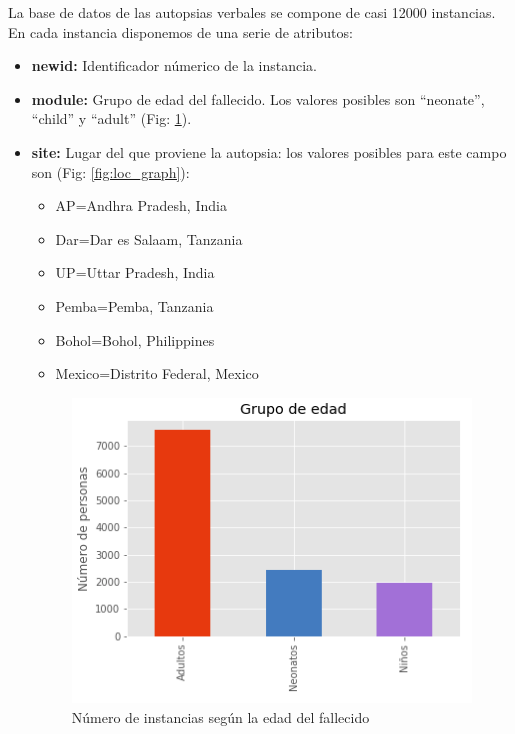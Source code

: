 \documentclass[10pt,a4paper]{article}
\begin{document}
La base de datos de las autopsias verbales se compone de casi 12000 instancias. En cada instancia disponemos de una serie de atributos:

\begin{itemize}
\item \textbf{newid:} Identificador númerico de la instancia.
\item \textbf{module:} Grupo de edad del fallecido. Los valores posibles son ``neonate'', ``child'' y ``adult'' (Fig: \ref{fig:age_graph}). 

\item \textbf{site:} Lugar del que proviene la autopsia: los valores posibles para este campo son (Fig: \ref{fig:loc_graph}): 
    \begin{itemize}
    \item AP=Andhra Pradesh, India
    \item Dar=Dar es Salaam, Tanzania
    \item UP=Uttar Pradesh, India
    \item Pemba=Pemba, Tanzania
    \item Bohol=Bohol, Philippines
    \item Mexico=Distrito Federal, Mexico
    \end{itemize}


\begin{figure}
  \includegraphics[width=\linewidth]{figures/plot_grupo_edad.png}
  \caption{Número de instancias según la edad del fallecido}
  \label{fig:age_graph}
\end{figure}


\end{itemize}
\end{document}
